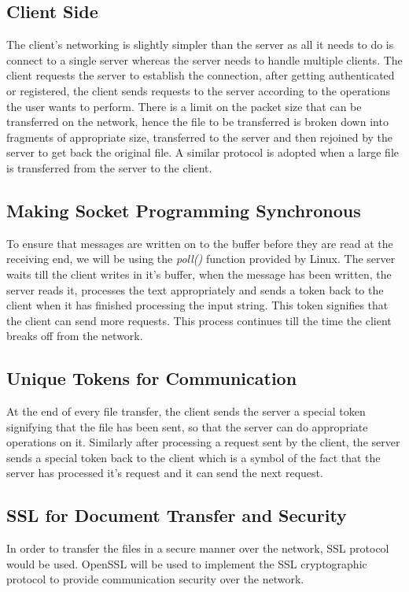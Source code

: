 \documentclass[]{article}
\begin{document}
\subsection{Client Side}
The client's networking is slightly simpler than the server as all it needs to do is connect to a single server whereas the server needs to handle multiple clients. The client requests the server to establish the connection, after getting authenticated or registered, the client sends requests to the server according to the operations the user wants to perform. There is a limit on the packet size that can be transferred on the network, hence the file to be transferred is broken down into fragments of appropriate size, transferred to the server and then rejoined by the server to get back the original file. A similar protocol is adopted when a large file is transferred from the server to the client.

\subsection{Making Socket Programming Synchronous}
To ensure that messages are written on to the buffer before they are read  at the receiving end, we will be using the \textit{poll()} function provided by Linux. The server waits till the client writes in it's buffer, when the message has been written, the server reads it, processes the text appropriately and sends a token back to the client when it has finished processing the input string. This token signifies that the client can send more requests. This process continues till the time the client breaks off from the network.

\subsection{Unique Tokens for Communication}
At the end of every file transfer, the client sends the server a special token signifying that the file has been sent, so that the server can do appropriate operations on it. Similarly after processing a request sent by the client, the server sends a special token back to the client which is a symbol of the fact that the server has processed it's request and it can send the next request. 

\subsection{SSL for Document Transfer and Security}
In order to transfer the files in a secure manner over the network, SSL protocol would be used. OpenSSL will be used to implement the SSL cryptographic protocol to provide communication security over the network.
\end{document}
